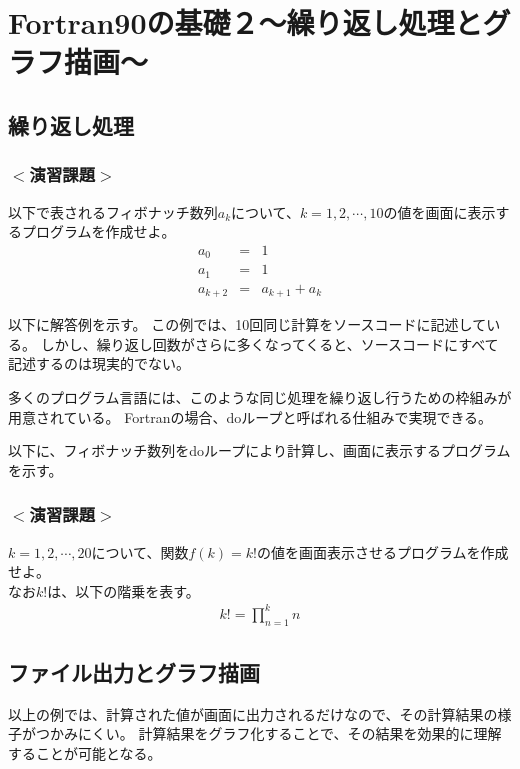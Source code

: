\chapter{Fortran90の基礎２〜繰り返し処理とグラフ描画〜}
\section{繰り返し処理}
\subsection*{$<$演習課題$>$}
以下で表されるフィボナッチ数列$a_k$について、$k=1,2, \cdots, 10$の値を画面に表示するプログラムを作成せよ。 \\
\begin{eqnarray}
a_0 &=& 1 \\
a_1 &=& 1 \\
a_{k+2} &=& a_{k+1} + a_k
\end{eqnarray}

以下に解答例を示す。
この例では、10回同じ計算をソースコードに記述している。
しかし、繰り返し回数がさらに多くなってくると、ソースコードにすべて記述するのは現実的でない。

多くのプログラム言語には、このような同じ処理を繰り返し行うための枠組みが用意されている。
Fortranの場合、{\ttfamily do}ループと呼ばれる仕組みで実現できる。

以下に、フィボナッチ数列を{\ttfamily do}ループにより計算し、画面に表示するプログラムを示す。



\subsection*{$<$演習課題$>$}
$k=1,2, \cdots, 20$について、関数$f(k) = k!$の値を画面表示させるプログラムを作成せよ。\\
なお$k!$は、以下の階乗を表す。
\begin{eqnarray}
k! = \prod_{n=1}^{k} n
\end{eqnarray}

%

\section{ファイル出力とグラフ描画}
以上の例では、計算された値が画面に出力されるだけなので、その計算結果の様子がつかみにくい。
計算結果をグラフ化することで、その結果を効果的に理解することが可能となる。


